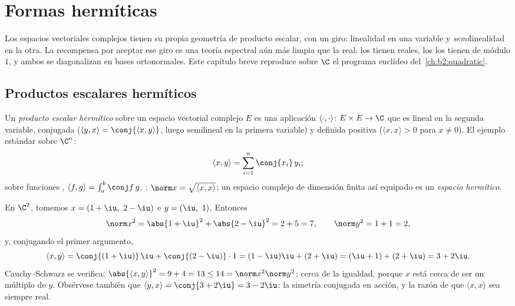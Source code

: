 \chapter{Formas hermíticas}\label{ch:b2:hermitian}

Los espacios vectoriales complejos tienen su propia geometría de
producto escalar, con un giro: linealidad en una variable y
\emph{semi}linealidad en la otra. La recompensa por aceptar ese giro es
una teoría espectral aún más limpia que la real: los
 tienen  reales, los
 los tienen de módulo $1$, y ambos se diagonalizan en bases
ortonormales. Este capítulo breve reproduce sobre $\C$ el programa
euclídeo del~\cref{ch:b2:quadratic}.

\section{Productos escalares hermíticos}

\begin{definition}\label{def:b2:hermitian:def}
Un \emph{producto escalar hermítico} sobre un espacio vectorial complejo $E$ es una aplicación
$\langle\cdot,\cdot\rangle \colon E \times E \to \C$ que es lineal en
la segunda variable,  conjugada ($\langle y, x\rangle =
\conj{\langle x, y\rangle}$, luego semilineal en la primera
variable) y definida positiva ($\langle x, x\rangle > 0$ para $x \neq
0$). El ejemplo estándar sobre $\C^n$:
\[
\langle x, y \rangle = \sum_{i=1}^{n} \conj{x_i}\, y_i ;
\]
sobre funciones , $\langle f, g\rangle = \int_a^b \conj
f\,g$. : $\norm x = \sqrt{\langle x,x\rangle}$; un espacio
complejo de dimensión finita así equipado es un \emph{espacio
hermítico}.
\end{definition}

\begin{example}\label{ex:b2:hermitian:firstcomp}
En $\C^2$, tomemos $x = (1+\iu,\ 2-\iu)$ e $y = (\iu,\ 1)$.
Entonces
\[
\norm x^2 = \abs{1+\iu}^2 + \abs{2-\iu}^2 = 2 + 5 = 7,
\qquad
\norm y^2 = 1 + 1 = 2,
\]
y, conjugando el primer argumento,
\[
\langle x, y\rangle
= \conj{(1+\iu)}\,\iu + \conj{(2-\iu)}\cdot1
= (1-\iu)\iu + (2+\iu)
= (\iu + 1) + (2 + \iu) = 3 + 2\iu .
\]
Cauchy--Schwarz se verifica: $\abs{\langle x, y\rangle}^2 = 9 + 4 =
13 \leq 14 = \norm x^2\norm y^2$; cerca de la igualdad, porque $x$
está cerca de ser un múltiplo de $y$. Obsérvese también que $\langle
y, x\rangle = \conj{3 + 2\iu} = 3 - 2\iu$: la simetría conjugada en
acción, y la razón de que $\langle x, x\rangle$ sea siempre real.
\end{example}

